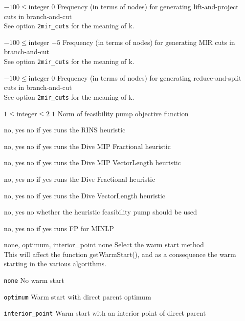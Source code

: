 %
{$-100\leq\textrm{integer}$}%
{$0$}%
{Frequency (in terms of nodes) for generating lift-and-project cuts in branch-and-cut\\
See option \texttt{2mir\_cuts} for the meaning of k.}%
{}

%
{$-100\leq\textrm{integer}$}%
{$-5$}%
{Frequency (in terms of nodes) for generating MIR cuts in branch-and-cut\\
See option \texttt{2mir\_cuts} for the meaning of k.}%
{}

%
{$-100\leq\textrm{integer}$}%
{$0$}%
{Frequency (in terms of nodes) for generating reduce-and-split cuts in branch-and-cut\\
See option \texttt{2mir\_cuts} for the meaning of k.}%
{}

%
{$1\leq\textrm{integer}\leq2$}%
{$1$}%
{Norm of feasibility pump objective function}%
{}

%
{no, yes}%
{no}%
{if yes runs the RINS heuristic}%
{
}

%
{no, yes}%
{no}%
{if yes runs the Dive MIP Fractional heuristic}%
{
}

%
{no, yes}%
{no}%
{if yes runs the Dive MIP VectorLength heuristic}%
{
}

%
{no, yes}%
{no}%
{if yes runs the Dive Fractional heuristic}%
{
}

%
{no, yes}%
{no}%
{if yes runs the Dive VectorLength heuristic}%
{
}

%
{no, yes}%
{no}%
{whether the heuristic feasibility pump should be used}%
{
}

%
{no, yes}%
{no}%
{if yes runs FP for MINLP}%
{
}

%
{none, optimum, interior\_point}%
{none}%
{Select the warm start method\\
This will affect the function getWarmStart(), and as a consequence the warm starting in the various algorithms.}%
{\begin{list}{}{
\setlength{\parsep}{0em}
\setlength{\leftmargin}{5ex}
\setlength{\labelwidth}{2ex}
\setlength{\itemindent}{0ex}
\setlength{\topsep}{0pt}}
\item[\texttt{none}] No warm start
\item[\texttt{optimum}] Warm start with direct parent optimum
\item[\texttt{interior\_point}] Warm start with an interior point of direct parent
\end{list}
}

